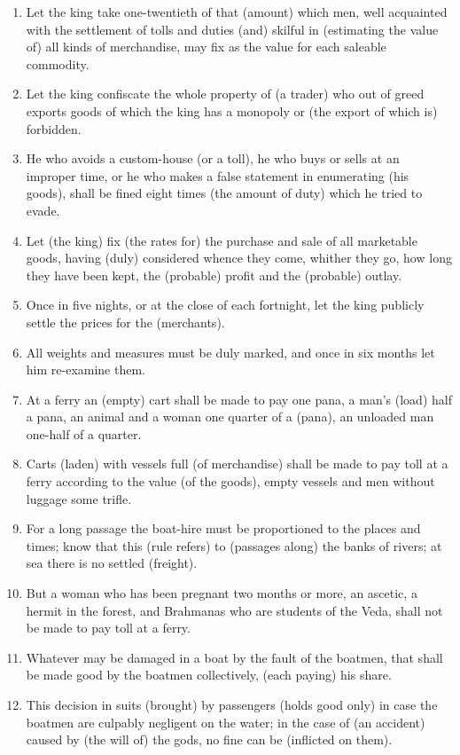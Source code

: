 \begin{enumerate}
\item Let the king take one-twentieth of that (amount) which men, well acquainted with the settlement of tolls and duties (and) skilful in (estimating the value of) all kinds of merchandise, may fix as the value for each saleable commodity.
\item Let the king confiscate the whole property of (a trader) who out of greed exports goods of which the king has a monopoly or (the export of which is) forbidden.
\item He who avoids a custom-house (or a toll), he who buys or sells at an improper time, or he who makes a false statement in enumerating (his goods), shall be fined eight times (the amount of duty) which he tried to evade.
\item Let (the king) fix (the rates for) the purchase and sale of all marketable goods, having (duly) considered whence they come, whither they go, how long they have been kept, the (probable) profit and the (probable) outlay.
\item Once in five nights, or at the close of each fortnight, let the king publicly settle the prices for the (merchants).
\item All weights and measures must be duly marked, and once in six months let him re-examine them.
\item At a ferry an (empty) cart shall be made to pay one pana, a man's (load) half a pana, an animal and a woman one quarter of a (pana), an unloaded man one-half of a quarter.
\item Carts (laden) with vessels full (of merchandise) shall be made to pay toll at a ferry according to the value (of the goods), empty vessels and men without luggage some trifle.
\item For a long passage the boat-hire must be proportioned to the places and times; know that this (rule refers) to (passages along) the banks of rivers; at sea there is no settled (freight).
\item But a woman who has been pregnant two months or more, an ascetic, a hermit in the forest, and Brahmanas who are students of the Veda, shall not be made to pay toll at a ferry.
\item Whatever may be damaged in a boat by the fault of the boatmen, that shall be made good by the boatmen collectively, (each paying) his share.
\item This decision in suits (brought) by passengers (holds good only) in case the boatmen are culpably negligent on the water; in the case of (an accident) caused by (the will of) the gods, no fine can be (inflicted on them).

\end{enumerate}
